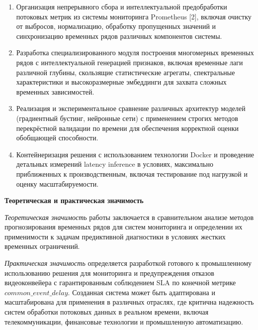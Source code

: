 \begin{enumerate}
	\item Организация непрерывного сбора и интеллектуальной предобработки потоковых метрик из системы мониторинга Prometheus [2], включая очистку от выбросов, нормализацию, обработку пропущенных значений и синхронизацию временных рядов различных компонентов системы.
	\item Разработка специализированного модуля построения многомерных временных рядов с интеллектуальной генерацией признаков, включая временные лаги различной глубины, скользящие статистические агрегаты, спектральные характеристики и высокоразмерные эмбеддинги для захвата сложных временных зависимостей.
	\item Реализация и экспериментальное сравнение различных архитектур моделей (градиентный бустинг, нейронные сети) с применением строгих методов перекрёстной валидации по времени для обеспечения корректной оценки обобщающей способности.
	\item Контейнеризация решения с использованием технологии Docker и проведение детальных измерений latency inference в условиях, максимально приближенных к производственным, включая тестирование под нагрузкой и оценку масштабируемости.
\end{enumerate}

\textbf{Теоретическая и практическая значимость}

\textit{Теоретическая значимость} работы заключается в сравнительном анализе методов прогнозирования временных рядов для систем мониторинга и определении их применимости к задачам предиктивной диагностики в условиях жестких временных ограничений.

\textit{Практическая значимость} определяется разработкой готового к промышленному использованию решения для мониторинга и предупреждения отказов видеоконвейера с гарантированным соблюдением SLA по конечной метрике $common\_event\_delay$. Созданная система может быть адаптирована и масштабирована для применения в различных отраслях, где критична надежность систем обработки потоковых данных в реальном времени, включая телекоммуникации, финансовые технологии и промышленную автоматизацию.
